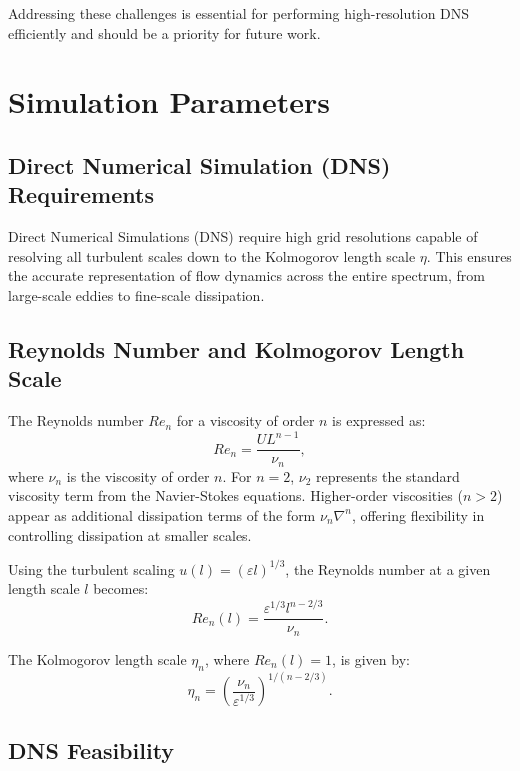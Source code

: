 \documentclass[final,5p,times,twocolumn,authoryear]{elsarticle}
\begin{document}
Addressing these challenges is essential for performing high-resolution DNS efficiently and should be a priority for future work.

\section{Simulation Parameters}

\subsection{Direct Numerical Simulation (DNS) Requirements}

Direct Numerical Simulations (DNS) require high grid resolutions capable of resolving all turbulent scales down to the Kolmogorov length scale $\eta$. This ensures the accurate representation of flow dynamics across the entire spectrum, from large-scale eddies to fine-scale dissipation. 

\subsection{Reynolds Number and Kolmogorov Length Scale}

The Reynolds number $Re_n$ for a viscosity of order $n$ is expressed as:
\begin{equation*}
    Re_n = \frac{U L^{n-1}}{\nu_n},
\end{equation*}
where $\nu_n$ is the viscosity of order $n$. For $n=2$, $\nu_2$ represents the standard viscosity term from the Navier-Stokes equations. Higher-order viscosities ($n>2$) appear as additional dissipation terms of the form $\nu_n \nabla^n$, offering flexibility in controlling dissipation at smaller scales.

Using the turbulent scaling $u(l) = (\varepsilon l)^{1/3}$, the Reynolds number at a given length scale $l$ becomes:
\begin{equation*}
    Re_n(l) = \frac{\varepsilon^{1/3} l^{n - 2/3}}{\nu_n}.
\end{equation*}

The Kolmogorov length scale $\eta_n$, where $Re_n(l) = 1$, is given by:
\begin{equation*}
    \eta_n = \left(\frac{\nu_n}{\varepsilon^{1/3}}\right)^{1 / (n - 2/3)}.
\end{equation*}

\subsection{DNS Feasibility}
\end{document}
